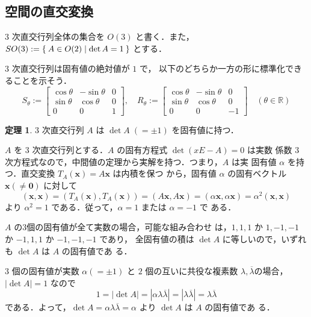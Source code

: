 \documentclass[11pt, uplatex, dvipdfmx, titlepage]{jsarticle}
\makeatletter
\renewcommand{\bar}[1]{\overline{#1}}
\renewenvironment{proof}[1][\proofname]{\par
  \pushQED{\qed}%
  \normalfont \topsep6\p@\@plus6\p@\relax
  \trivlist
  \item[\hskip\labelsep
         \bfseries
    {#1}]\ignorespaces
}{%
  \popQED\endtrivlist\@endpefalse
}
\theoremstyle{definition}
\newtheorem{theorem}{定理}[section]
\renewcommand{\proofname}{\textbf{証明}}
\makeatother
\begin{document}
\subsection{空間の直交変換}

$3$ 次直交行列全体の集合を $O(3)$ と書く．また，$SO(3):=\Set{ A \in
  O(2) | \det A=1}$ とする．

$3$ 次直交行列は固有値の絶対値が $1$ で，
以下のどちらか一方の形に標準化できることを示そう．
\[
  S_{\theta} := \left[
    \begin{array}{ccc}
      \cos \theta & -\sin\theta & 0\\
      \sin \theta & \cos\theta & 0\\
      0 & 0 & 1
    \end{array}
  \right], \quad R_{\theta} := \left[
    \begin{array}{ccc}
      \cos\theta & -\sin\theta & 0\\
      \sin\theta & \cos\theta & 0\\
      0 & 0 & -1
    \end{array}
  \right] \quad ( \theta \in \mathbb{R})
\]

\begin{theorem}\label{thm:eigenvalue3}
  $3$ 次直交行列 $A$ は $\det A \; \left( = \pm 1\right)$ を固有値に持つ．
\end{theorem}

\begin{proof}
  $A$ を $3$ 次直交行列とする．$A$ の固有方程式 $\det(x E -A)=0$ は実数
  係数 $3$ 次方程式なので，中間値の定理から実解を持つ．つまり，$A$ は実
  固有値 $\alpha$ を持つ．直交変換 $T_A(\bm{x}) = A\bm{x}$ は内積を保つ
  から，固有値 $\alpha$ の固有ベクトル $\bm{x} \left( \neq
    \bm{0}\right)$ に対して
  \[
    (\bm{x}, \bm{x}) = \left(T_A(\bm{x}), T_A(\bm{x}) \right)=
    (A\bm{x}, A\bm{x}) = (\alpha \bm{x}, \alpha \bm{x}) = \alpha^2
    (\bm{x}, \bm{x})
  \]
  より $\alpha^2 = 1$ である．従って，$\alpha=1$ または $\alpha=-1$ で
  ある．

  $A$ の3個の固有値が全て実数の場合，可能な組み合わせ
  は，$1,1,1$ か $1,-1,-1$ か $-1, 1,1$ か $-1,-1,-1$ であり，
  全固有値の積は $\det A$ に等しいので，いずれも $\det A$ は $A$ の固有値であ
  る．

  $3$ 個の固有値が実数 $\alpha \left( = \pm 1\right) $ と $2$
  個の互いに共役な複素数 $\lambda, \bar{\lambda}$の場合，$|\det A|=1$
  なので
  \[
    1 = |\det A| = |\alpha \lambda \bar{\lambda}| = |\lambda \bar{\lambda}| = \lambda \bar{\lambda}
  \]
  である．よって，$\det A = \alpha \lambda \bar{\lambda}=\alpha$ より $\det A$ は $A$ の固有値であ
  る．
\end{proof}
\end{document}
